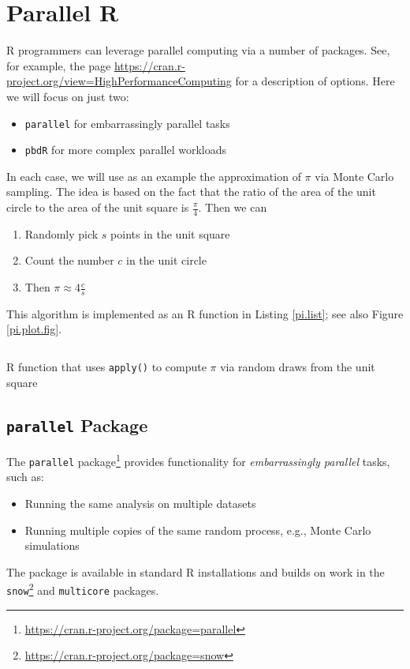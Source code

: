 \section{Parallel R}
R programmers can leverage parallel computing via a number of packages. See, for example, the page \url{https://cran.r-project.org/view=HighPerformanceComputing} for a description of options. Here we will focus on just two:
\begin{itemize}
    \item \texttt{parallel} for embarrassingly parallel tasks
    \item \texttt{pbdR} for more complex parallel workloads
\end{itemize}

In each case, we will use as an example the approximation of $\pi$ via Monte Carlo sampling. The idea is based on the fact that the ratio of the area of the unit circle to the area of the unit square is $\frac{\pi}{4}$. Then we can
\begin{enumerate}
  \item Randomly pick $s$ points in the unit square
  \item Count the number $c$ in the unit circle
  \item Then $\pi \approx 4 \frac{c}{s}$
\end{enumerate}
This algorithm is implemented as an R function in Listing \ref{pi.list}; see also Figure \ref{pi.plot.fig}.
  
\begin{listing}[ht]
\inputminted{R}{code/L22/mcpi.r}
\caption{R function that uses \texttt{apply()} to compute $\pi$ via random draws from the unit square}
\label{pi.list}
\end{listing}

\subsection{\texttt{parallel} Package}
The \texttt{parallel} package\footnote{\url{https://cran.r-project.org/package=parallel}} provides functionality for \textit{embarrassingly parallel} tasks, such as:
    \begin{itemize}
      \item Running the same analysis on multiple datasets
      \item Running multiple copies of the same random process, e.g., Monte Carlo simulations
    \end{itemize}
The package is available in standard R installations and builds on work in the \texttt{snow}\footnote{\url{https://cran.r-project.org/package=snow}} and \texttt{multicore} packages.

